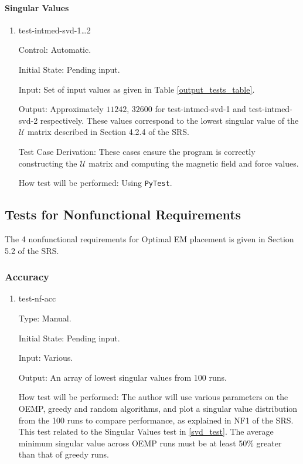 \documentclass[12pt, titlepage]{article}
\begin{document}
\paragraph{Singular Values}

\begin{enumerate}

  \item{test-intmed-svd-1\dots2\\} 
  
  Control: Automatic.
            
  Initial State: Pending input.
            
  Input: Set of input values as given in Table \ref{output_tests_table}.
            
  Output: Approximately $11242$, $32600$ for test-intmed-svd-1 and test-intmed-svd-2 respectively. These values correspond to the lowest singular value of the $\mathcal{U}$ matrix described in Section 4.2.4 of the SRS.
  
  Test Case Derivation: These cases ensure the program is correctly constructing the $\mathcal{U}$ matrix and computing the magnetic field and force values. 
            
  How test will be performed: Using \texttt{PyTest}. 
\end{enumerate}

\subsection{Tests for Nonfunctional Requirements} \label{test_nfr}
The 4 nonfunctional requirements for Optimal EM placement is given in Section 5.2 of the SRS. 
\subsubsection{Accuracy}
\begin{enumerate}

\item{test-nf-acc\\}

Type: Manual.
					
Initial State: Pending input.
					
Input: Various.
					
Output: An array of lowest singular values from 100 runs.
					
How test will be performed: The author will use various parameters on the OEMP, greedy and random algorithms, and plot a singular value distribution from the 100 runs to compare performance, as explained in NF1 of the SRS. This test related to the Singular Values test in \ref{svd_test}. The average minimum singular value across OEMP runs must be at least 50\% greater than that of greedy runs. 
\end{enumerate}
\end{document}
